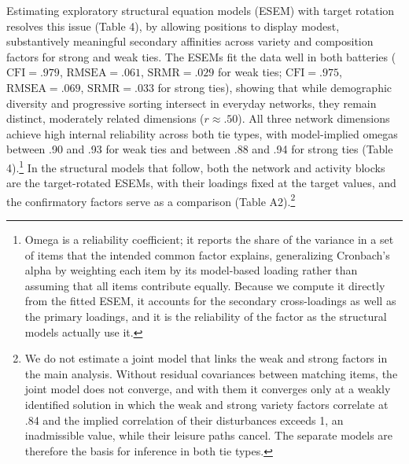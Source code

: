 \documentclass[
  12pt
]{article}
\begin{document}
Estimating exploratory structural equation models (ESEM) with target rotation resolves this issue (Table 4), by allowing positions to display modest, substantively meaningful secondary affinities across variety and composition factors for strong and weak ties. The ESEMs fit the data well in both batteries ($\text{CFI} = .979$, $\text{RMSEA} = .061$, $\text{SRMR} = .029$ for weak ties; $\text{CFI} = .975$, $\text{RMSEA} = .069$, $\text{SRMR} = .033$ for strong ties), showing that while demographic diversity and progressive sorting intersect in everyday networks, they remain distinct, moderately related dimensions ($r \approx .50$). All three network dimensions achieve high internal reliability across both tie types, with model-implied omegas between .90 and .93 for weak ties and between .88 and .94 for strong ties (Table 4).\footnote{Omega is a reliability coefficient; it reports the share of the variance in a set of items that the intended common factor explains, generalizing Cronbach's alpha by weighting each item by its model-based loading rather than assuming that all items contribute equally. Because we compute it directly from the fitted ESEM, it accounts for the secondary cross-loadings as well as the primary loadings, and it is the reliability of the factor as the structural models actually use it.} In the structural models that follow, both the network and activity blocks are the target-rotated ESEMs, with their loadings fixed at the target values, and the confirmatory factors serve as a comparison (Table A2).\footnote{We do not estimate a joint model that links the weak and strong factors in the main analysis. Without residual covariances between matching items, the joint model does not converge, and with them it converges only at a weakly identified solution in which the weak and strong variety factors correlate at .84 and the implied correlation of their disturbances exceeds 1, an inadmissible value, while their leisure paths cancel. The separate models are therefore the basis for inference in both tie types.}
\end{document}
